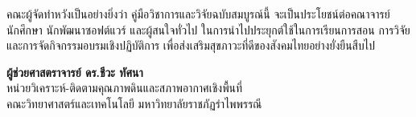 คณะผู้จัดทำหวังเป็นอย่างยิ่งว่า คู่มือวิชาการและวิจัยฉบับสมบูรณ์นี้ จะเป็นประโยชน์ต่อคณาจารย์ นักศึกษา นักพัฒนาซอฟต์แวร์ และผู้สนใจทั่วไป ในการนำไปประยุกต์ใช้ในการเรียนการสอน การวิจัย และการจัดกิจกรรมอบรมเชิงปฏิบัติการ เพื่อส่งเสริมสุขภาวะที่ดีของสังคมไทยอย่างยั่งยืนสืบไป

\vspace{1.5cm}

\begin{flushright}
  \textbf{ผู้ช่วยศาสตราจารย์ ดร.ชีวะ ทัศนา}\\
  หน่วยวิเคราะห์-ติดตามคุณภาพดินและสภาพอากาศเชิงพื้นที่\\
  คณะวิทยาศาสตร์และเทคโนโลยี มหาวิทยาลัยราชภัฏรำไพพรรณี
\end{flushright}
